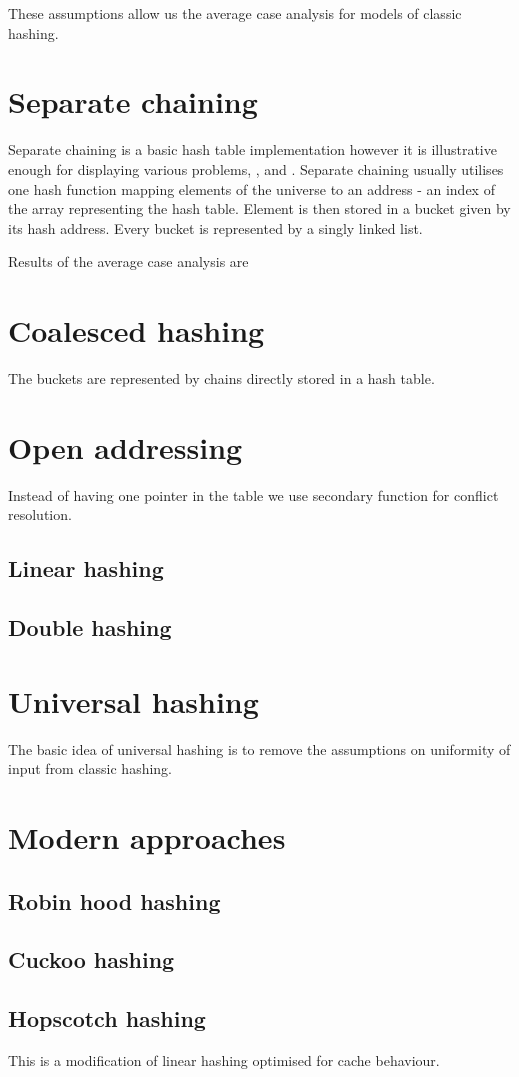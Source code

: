 These assumptions allow us the average case analysis for models of classic hashing.

\section{Separate chaining}
Separate chaining is a basic hash table implementation however it is illustrative enough for displaying various problems, \cite{The-art-of-computer-programming}, \cite{DBLP:books/sp/Mehlhorn84} and \cite{DBLP:books/sp/MehlhornS2008}. Separate chaining usually utilises one hash function mapping elements of the universe to an address - an index of the array representing the hash table. Element is then stored in a bucket given by its hash address. Every bucket is represented by a singly linked list. 

Results of the average case analysis are 

\section{Coalesced hashing}
The buckets are represented by chains directly stored in a hash table.

\section{Open addressing}
Instead of having one pointer in the table we use secondary function for conflict resolution.
\subsection{Linear hashing}
\subsection{Double hashing}

\section{Universal hashing}
The basic idea of universal hashing is to remove the assumptions on uniformity of input from classic hashing.

\section{Modern approaches}
\subsection{Robin hood hashing}
\subsection{Cuckoo hashing}
\subsection{Hopscotch hashing}
This is a modification of linear hashing optimised for cache behaviour.